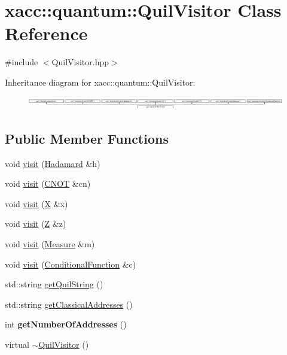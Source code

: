 \hypertarget{a01208}{}\section{xacc\+:\+:quantum\+:\+:Quil\+Visitor Class Reference}
\label{a01208}


{\ttfamily \#include $<$Quil\+Visitor.\+hpp$>$}

Inheritance diagram for xacc\+:\+:quantum\+:\+:Quil\+Visitor\+:\begin{figure}[H]
\begin{center}
\leavevmode
\includegraphics[height=0.565371cm]{a01208}
\end{center}
\end{figure}
\subsection*{Public Member Functions}
\begin{DoxyCompactItemize}
\item 
void \hyperlink{a01208_a5470d573fdcfd691c100fcbfeeed45db}{visit} (\hyperlink{a01308}{Hadamard} \&h)
\item 
void \hyperlink{a01208_ac51ed9d947d3fa00525eb79b2bbc9021}{visit} (\hyperlink{a01300}{C\+N\+OT} \&cn)
\item 
void \hyperlink{a01208_a0b1a31a900f87a3f91f640ab5caec126}{visit} (\hyperlink{a01320}{X} \&x)
\item 
void \hyperlink{a01208_af429121067a397eeac17328fc0244859}{visit} (\hyperlink{a01324}{Z} \&z)
\item 
void \hyperlink{a01208_acbe2afe1c9741112d1f9196681f8b896}{visit} (\hyperlink{a01312}{Measure} \&m)
\item 
void \hyperlink{a01208_a7665ecdf9984374f52d30d7767649cf9}{visit} (\hyperlink{a01304}{Conditional\+Function} \&c)
\item 
std\+::string \hyperlink{a01208_a9808ecc5766ea2c387107dff6b64cdb8}{get\+Quil\+String} ()
\item 
std\+::string \hyperlink{a01208_ab4a1c6a92772a09c22068ced7d3dc76c}{get\+Classical\+Addresses} ()
\item 
\mbox{\label{a01208_a561aabf6de48ae9aee4fbe868f1c5da1}} 
int {\bfseries get\+Number\+Of\+Addresses} ()
\item 
virtual \hyperlink{a01208_a90dcced4e75c7b45c287fb4edc58ed01}{$\sim$\+Quil\+Visitor} ()
\end{DoxyCompactItemize}
